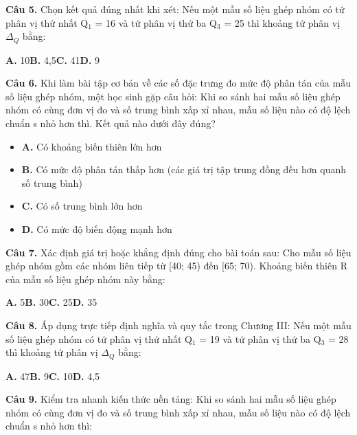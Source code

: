 \documentclass[11pt,a4paper]{article}
\begin{document}
\textbf{\color{primary} Câu 5.} Chọn kết quả đúng nhất khi xét: Nếu một mẫu số liệu ghép nhóm có tứ phân vị thứ nhất Q$_1$ = 16 và tứ phân vị thứ ba Q$_3$ = 25 thì khoảng tứ phân vị $\Delta_Q$ bằng:\par
\hspace*{1.5em}\textbf{A.} 10\quad\quad \textbf{B.} 4,5\quad\quad \textbf{C.} 41\quad\quad \textbf{D.} 9\par\vspace{2pt}
\textbf{\color{primary} Câu 6.} Khi làm bài tập cơ bản về các số đặc trưng đo mức độ phân tán của mẫu số liệu ghép nhóm, một học sinh gặp câu hỏi: Khi so sánh hai mẫu số liệu ghép nhóm có cùng đơn vị đo và số trung bình xấp xỉ nhau, mẫu số liệu nào có độ lệch chuẩn s nhỏ hơn thì. Kết quả nào dưới đây đúng?\par
\begin{itemize}\setlength{\itemsep}{1pt}\setlength{\parskip}{0pt}
  \item[] \textbf{A.} Có khoảng biến thiên lớn hơn
  \item[] \textbf{B.} Có mức độ phân tán thấp hơn (các giá trị tập trung đồng đều hơn quanh số trung bình)
  \item[] \textbf{C.} Có số trung bình lớn hơn
  \item[] \textbf{D.} Có mức độ biến động mạnh hơn
\end{itemize}\vspace{2pt}
\textbf{\color{primary} Câu 7.} Xác định giá trị hoặc khẳng định đúng cho bài toán sau: Cho mẫu số liệu ghép nhóm gồm các nhóm liên tiếp từ [40; 45) đến [65; 70). Khoảng biến thiên R của mẫu số liệu ghép nhóm này bằng:\par
\hspace*{1.5em}\textbf{A.} 5\quad\quad \textbf{B.} 30\quad\quad \textbf{C.} 25\quad\quad \textbf{D.} 35\par\vspace{2pt}
\textbf{\color{primary} Câu 8.} Áp dụng trực tiếp định nghĩa và quy tắc trong Chương III: Nếu một mẫu số liệu ghép nhóm có tứ phân vị thứ nhất Q$_1$ = 19 và tứ phân vị thứ ba Q$_3$ = 28 thì khoảng tứ phân vị $\Delta_Q$ bằng:\par
\hspace*{1.5em}\textbf{A.} 47\quad\quad \textbf{B.} 9\quad\quad \textbf{C.} 10\quad\quad \textbf{D.} 4,5\par\vspace{2pt}
\textbf{\color{primary} Câu 9.} Kiểm tra nhanh kiến thức nền tảng: Khi so sánh hai mẫu số liệu ghép nhóm có cùng đơn vị đo và số trung bình xấp xỉ nhau, mẫu số liệu nào có độ lệch chuẩn s nhỏ hơn thì:\par
\end{document}
